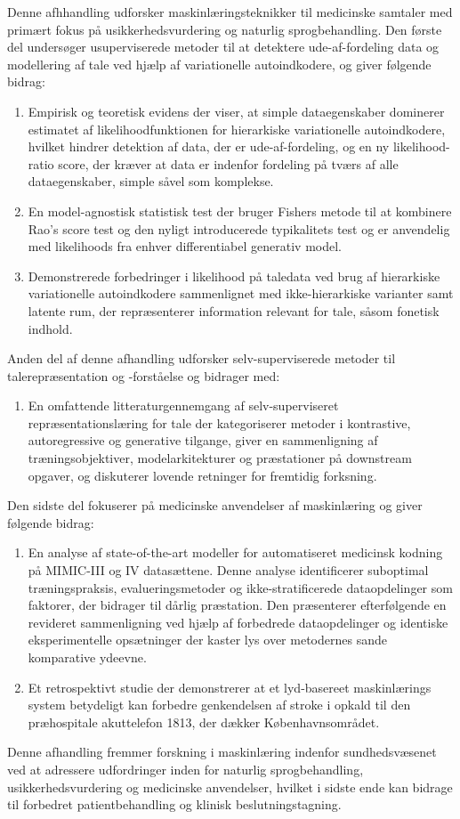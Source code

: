 Denne afhhandling udforsker maskinlæringsteknikker til medicinske samtaler med primært fokus på usikkerhedsvurdering og naturlig sprogbehandling. Den første del undersøger usuperviserede metoder til at detektere ude-af-fordeling data og modellering af tale ved hjælp af variationelle autoindkodere, og giver følgende bidrag:
%
\begin{enumerate}[label=(\roman*)] 
    \item Empirisk og teoretisk evidens der viser, at simple dataegenskaber dominerer 
    estimatet af likelihoodfunktionen for hierarkiske variationelle autoindkodere, hvilket hindrer detektion af data, der er ude-af-fordeling, og en ny likelihood-ratio score, der kræver at data er indenfor fordeling på tværs af alle dataegenskaber, simple såvel som komplekse.
    \item En model-agnostisk statistisk test der bruger Fishers metode til at kombinere Rao's score test og den nyligt introducerede typikalitets test og er anvendelig med likelihoods fra enhver differentiabel generativ model.
    \item Demonstrerede forbedringer i likelihood på taledata ved brug af hierarkiske variationelle autoindkodere sammenlignet med ikke-hierarkiske varianter samt latente rum, der repræsenterer information relevant for tale, såsom fonetisk indhold.
\end{enumerate}
%
Anden del af denne afhandling udforsker selv-superviserede metoder til talerepræsentation og -forståelse og bidrager med:
%
\begin{enumerate}[label=(\roman*)] 
    \item En omfattende litteraturgennemgang af selv-superviseret repræsentationslæring for tale der kategoriserer metoder i kontrastive, autoregressive og generative tilgange, giver en sammenligning af træningsobjektiver, modelarkitekturer og præstationer på downstream opgaver, og diskuterer lovende retninger for fremtidig forksning.
\end{enumerate}
%
Den sidste del fokuserer på medicinske anvendelser af maskinlæring og giver følgende bidrag:
%
\begin{enumerate}[label=(\roman*)] 
    \item En analyse af state-of-the-art modeller for automatiseret medicinsk kodning på MIMIC-III og IV datasættene. Denne analyse identificerer suboptimal træningspraksis, evalueringsmetoder og ikke-stratificerede dataopdelinger som faktorer, der bidrager til dårlig præstation. Den præsenterer efterfølgende en revideret sammenligning ved hjælp af forbedrede dataopdelinger og identiske eksperimentelle opsætninger der kaster lys over metodernes sande komparative ydeevne.
    \item Et retrospektivt studie der demonstrerer at et lyd-basereet maskinlærings system betydeligt kan forbedre genkendelsen af stroke i opkald til den præhospitale akuttelefon 1813, der dækker Københavnsområdet.
\end{enumerate}
%
Denne afhandling fremmer forskning i maskinlæring indenfor sundhedsvæsenet ved at adressere udfordringer inden for naturlig sprogbehandling, usikkerhedsvurdering og medicinske anvendelser, hvilket i sidste ende kan bidrage til forbedret patientbehandling og klinisk beslutningstagning.

